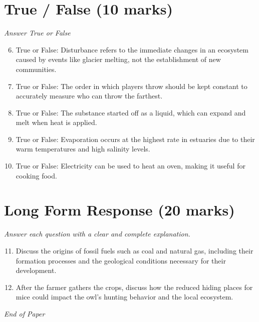 \documentclass[12pt]{article}
\begin{document}
\section*{True / False (10 marks)}
\textit{Answer True or False}
\begin{enumerate}[label=\arabic*.]
\setcounter{enumi}{5}
\item True or False: Disturbance refers to the immediate changes in an ecosystem caused by events like glacier melting, not the establishment of new communities.
\item True or False: The order in which players throw should be kept constant to accurately measure who can throw the farthest.
\item True or False: The substance started off as a liquid, which can expand and melt when heat is applied.
\item True or False: Evaporation occurs at the highest rate in estuaries due to their warm temperatures and high salinity levels.
\item True or False: Electricity can be used to heat an oven, making it useful for cooking food.
\end{enumerate}

\section*{Long Form Response (20 marks)}
\textit{Answer each question with a clear and complete explanation.}
\begin{enumerate}[label=\arabic*.]
\setcounter{enumi}{10}
\item Discuss the origins of fossil fuels such as coal and natural gas, including their formation processes and the geological conditions necessary for their development.
\item After the farmer gathers the crops, discuss how the reduced hiding places for mice could impact the owl's hunting behavior and the local ecosystem.
\end{enumerate}

\vfill
\noindent\textit{End of Paper}
\end{document}
